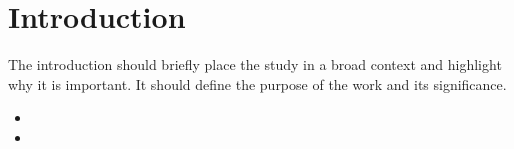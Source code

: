 \documentclass[12pt, a4paper, oneside, openright]{Thesis} %
\begin{document}
 














\pagestyle{fancy} %


\pagestyle{fancy} %


\section{Introduction}
The introduction should briefly place the study in a broad context and highlight why it is important. It should define the purpose of the work and its significance. 
\begin{itemize}
    \item 
    \item 

\end{itemize}
\end{document}
